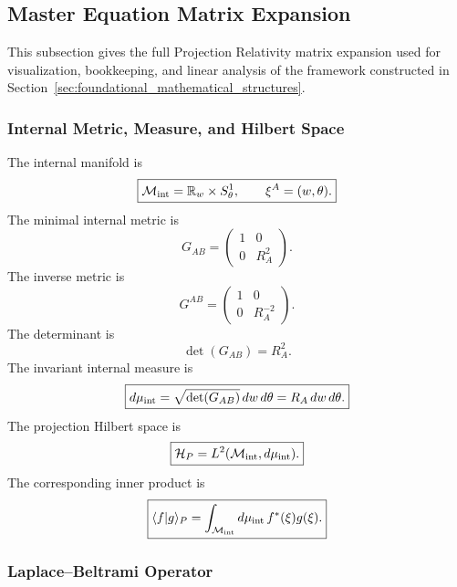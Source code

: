 \documentclass[11pt]{article}
\begin{document}
\subsection{Master Equation Matrix Expansion}
\label{app:matrix-expansion}

This subsection gives the full Projection Relativity matrix expansion used for visualization, bookkeeping, and linear analysis of the framework constructed in Section~\ref{sec:foundational_mathematical_structures}.

\subsubsection{Internal Metric, Measure, and Hilbert Space}
\label{app:internal-metric}

The internal manifold is
\begin{equation}
\boxed{
\mathcal M_{\rm int}
=
\mathbb R_w\times S^1_\theta,
\qquad
\xi^A=(w,\theta).
}
\end{equation}
The minimal internal metric is
\begin{equation}
\boxed{
G_{AB}
=
\begin{pmatrix}
1 & 0 \\
0 & R_A^2
\end{pmatrix}.
}
\end{equation}
The inverse metric is
\begin{equation}
\boxed{
G^{AB}
=
\begin{pmatrix}
1 & 0 \\
0 & R_A^{-2}
\end{pmatrix}.
}
\end{equation}
The determinant is
\begin{equation}
\boxed{
\det(G_{AB})=R_A^2.
}
\end{equation}
The invariant internal measure is
\begin{equation}
\boxed{
d\mu_{\rm int}
=
\sqrt{\det(G_{AB})}\,dw\,d\theta
=
R_A\,dw\,d\theta.
}
\end{equation}
The projection Hilbert space is
\begin{equation}
\boxed{
\mathcal H_P
=
L^2(\mathcal M_{\rm int},d\mu_{\rm int}).
}
\end{equation}
The corresponding inner product is
\begin{equation}
\boxed{
\langle f|g\rangle_P
=
\int_{\mathcal M_{\rm int}}
d\mu_{\rm int}\,
f^*(\xi)g(\xi).
}
\end{equation}

\subsubsection{Laplace--Beltrami Operator}
\label{app:laplace-beltrami}
\end{document}
